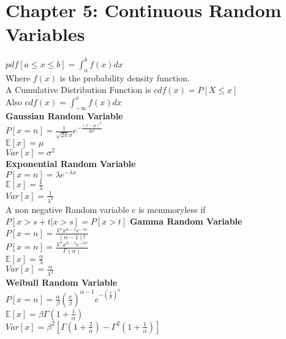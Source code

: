 \documentclass{article}
\begin{document}
\section{Chapter 5: Continuous Random Variables}
$pdf[a \leq x \leq b] = \int_{a}^{b} f(x)dx$\\
Where $f(x)$ is the probability density function.\\
A Cumulative Distribution Function is $cdf(x) = P[X \leq x]$\\
Also $cdf(x) = \int_{-\infty}^{x} f(x)dx$\\
\textbf{Gaussian Random Variable}\\
$P[x=n] = \frac{1}{\sqrt{2\pi}\sigma}e^{-\frac{(x-\mu)^2}{2\sigma^2}}$\\
$\mathbb{E}[x] = \mu$\\
$Var[x] = \sigma^2$\\
\textbf{Exponential Random Variable}\\
$P[x=n] = \lambda e^{-\lambda x}$\\
$\mathbb{E}[x] = \frac{1}{\lambda}$\\
$Var[x] = \frac{1}{\lambda^2}$\\
A non negative Random variable c is memmoryless if $P[x>s+t | x > s] = P[x>t]$
\textbf{Gamma Random Variable}\\
$P[x=n] = \frac{\lambda^{\alpha}x^{\alpha - 1}e^{-\lambda x}}{(\alpha - 1)!}$\\
$P[x=n] = \frac{\lambda^{\alpha}x^{\alpha - 1}e^{-\lambda x}}{\Gamma(\alpha)}$\\
$\mathbb{E}[x] = \frac{\alpha}{\lambda}$\\
$Var[x] = \frac{\alpha}{\lambda^2}$\\
\textbf{Weibull Random Variable}\\
$P[x=n] = \frac{\alpha}{\beta}(\frac{x}{\beta})^{\alpha - 1}e^{-(\frac{x}{\beta})^{\alpha}}$\\
$\mathbb{E}[x] = \beta \Gamma(1 + \frac{1}{\alpha})$\\
$Var[x] = \beta^2[\Gamma(1 + \frac{2}{\alpha}) - \Gamma^2(1 + \frac{1}{\alpha})]$\\
\end{document}
